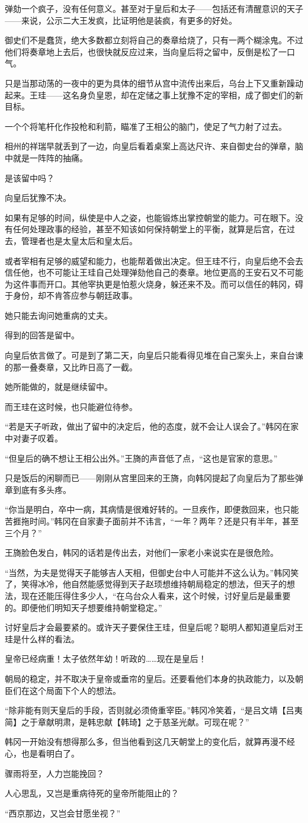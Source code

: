 弹劾一个疯子，没有任何意义。甚至对于皇后和太子——包括还有清醒意识的天子——来说，公示二大王发疯，比证明他是装疯，有更多的好处。

御史们不是蠢货，绝大多数都立刻将自己的奏章给烧了，只有一两个糊涂鬼。不过他们将奏章地上去后，也很快就反应过来，当向皇后将之留中，反倒是松了一口气。

只是当那动荡的一夜中的更为具体的细节从宫中流传出来后，乌台上下又重新躁动起来。王珪——这名身负皇恩，却在定储之事上犹豫不定的宰相，成了御史们的新目标。

一个个将笔杆化作投枪和利箭，瞄准了王相公的脑门，使足了气力射了过去。

相州的祥瑞早就丢到了一边，向皇后看着桌案上高达尺许、来自御史台的弹章，脑中就是一阵阵的抽痛。

是该留中吗？

向皇后犹豫不决。

如果有足够的时间，纵使是中人之姿，也能锻炼出掌控朝堂的能力。可在眼下。没有任何处理政事的经验，甚至不知该如何保持朝堂上的平衡，就算是后宫，在过去，管理者也是太皇太后和皇太后。

或者宰相有足够的威望和能力，也能帮着做出决定。但王珪不行，向皇后绝不会去信任他，也不可能让王珪自己处理弹劾他自己的奏章。地位更高的王安石又不可能为这件事而开口。其他宰执更是怕惹火烧身，躲还来不及。而可以信任的韩冈，碍于身份，却不肯答应参与朝廷政事。

她只能去询问她重病的丈夫。

得到的回答是留中。

向皇后依言做了。可是到了第二天，向皇后只能看得见堆在自己案头上，来自台谏的那一叠奏章，又比昨日高了一截。

她所能做的，就是继续留中。

而王珪在这时候，也只能避位待参。

“若是天子听政，做出了留中的决定后，他的态度，就不会让人误会了。”韩冈在家中对妻子叹着。

“但皇后的确不想让王相公出外。”王旖的声音低了点，“这也是官家的意思。”

只是饭后的闲聊而已——刚刚从宫里回来的王旖，向韩冈提起了向皇后为了那些弹章到底有多头疼。

“你当是明白，卒中一病，其病情是很难好转的。一旦疾作，即便救回来，也只能苦捱拖时间。”韩冈在自家妻子面前并不讳言，“一年？两年？还是只有半年，甚至三个月？”

王旖脸色发白，韩冈的话若是传出去，对他们一家老小来说实在是很危险。

“当然，为夫是觉得天子能够吉人天相，但御史台中人可能并不这么认为。”韩冈笑了，笑得冰冷，他自然能感觉得到天子赵顼想维持朝局稳定的想法，但天子的想法，现在还能压得住多少人，“在乌台众人看来，这个时候，讨好皇后是最重要的。即便他们明知天子想要维持朝堂稳定。”

讨好皇后才会最要紧的。或许天子要保住王珪，但皇后呢？聪明人都知道皇后对王珪是什么样的看法。

皇帝已经病重！太子依然年幼！听政的……现在是皇后！

朝局的稳定，并不取决于皇帝或垂帘的皇后。还要看他们本身的执政能力，以及朝臣们在这个局面下个人的想法。

“除非能有则天皇后的手段，否则就必须倚重宰臣。”韩冈冷笑着，“是吕文靖【吕夷简】之于章献明肃，是韩忠献【韩琦】之于慈圣光献。可现在呢？”

韩冈一开始没有想得那么多，但当他看到这几天朝堂上的变化后，就算再漫不经心，也是看明白了。

骤雨将至，人力岂能挽回？

人心思乱，又岂是重病待死的皇帝所能阻止的？

“西京那边，又岂会甘愿坐视？”


